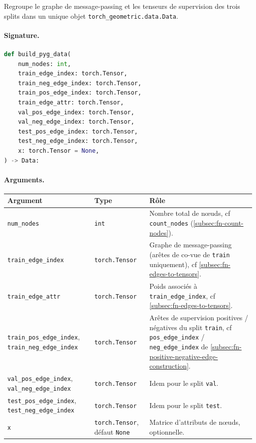 \documentclass[11pt,a4paper]{article}
\newcommand{\code}[1]{\texttt{\small #1}}
\begin{document}
Regroupe le graphe de message-passing et les tenseurs de supervision des trois
splits dans un unique objet \code{torch\_geometric.data.Data}.

\paragraph{Signature.}\leavevmode\par
\begin{lstlisting}[language=Python]
def build_pyg_data(
    num_nodes: int,
    train_edge_index: torch.Tensor,
    train_neg_edge_index: torch.Tensor,
    train_pos_edge_index: torch.Tensor,
    train_edge_attr: torch.Tensor,
    val_pos_edge_index: torch.Tensor,
    val_neg_edge_index: torch.Tensor,
    test_pos_edge_index: torch.Tensor,
    test_neg_edge_index: torch.Tensor,
    x: torch.Tensor = None,
) -> Data:
\end{lstlisting}

\paragraph{Arguments.}
\begin{center}
\small
\begin{tabular}{@{}p{4.6cm}lp{6.8cm}@{}}
\toprule
\textbf{Argument} & \textbf{Type} & \textbf{Rôle} \\
\midrule
\code{num\_nodes} & \code{int} & Nombre total de nœuds, cf \code{count\_nodes}
  (\ref{subsec:fn-count-nodes}). \\
\code{train\_edge\_index} & \code{torch.Tensor} & Graphe de message-passing
  (arêtes de co-vue de \code{train} uniquement), cf
  \ref{subsec:fn-edges-to-tensors}. \\
\code{train\_edge\_attr} & \code{torch.Tensor} & Poids associés à
  \code{train\_edge\_index}, cf \ref{subsec:fn-edges-to-tensors}. \\
\code{train\_pos\_edge\_index}, \code{train\_neg\_edge\_index} &
  \code{torch.Tensor} & Arêtes de supervision positives / négatives du split
  \code{train}, cf \code{pos\_edge\_index} / \code{neg\_edge\_index} de
  \ref{subsec:fn-positive-negative-edge-construction}. \\
\code{val\_pos\_edge\_index}, \code{val\_neg\_edge\_index} & \code{torch.Tensor}
  & Idem pour le split \code{val}. \\
\code{test\_pos\_edge\_index}, \code{test\_neg\_edge\_index} &
  \code{torch.Tensor} & Idem pour le split \code{test}. \\
\code{x} & \code{torch.Tensor}, défaut \code{None} & Matrice d'attributs de
  nœuds, optionnelle. \\
\bottomrule
\end{tabular}
\end{center}
\end{document}
